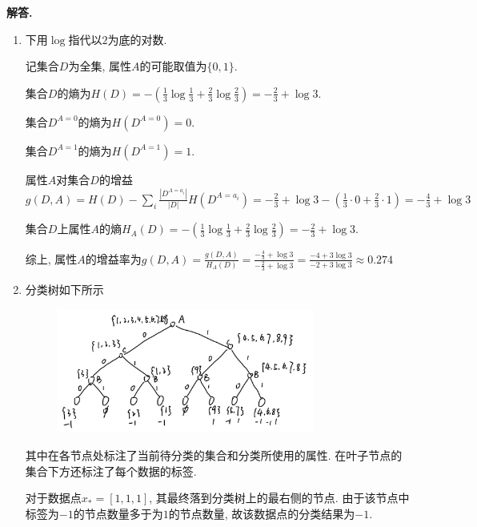 \documentclass[11pt]{article}
\newenvironment{solution}{\par\noindent\textbf{解答. }}{\par}
\begin{document}
	\section{}
	\begin{solution}
		\begin{enumerate}[(1)]
			\item 下用$\log$指代以$2$为底的对数.
			
			记集合$D$为全集, 属性$A$的可能取值为$\{0,1\}$. 
			
			集合$D$的熵为$H(D)=-\left(\frac{1}{3}\log\frac{1}{3}+\frac{2}{3}\log\frac{2}{3}\right)=-\frac{2}{3}+\log 3$.

			集合$D^{A=0}$的熵为$H(D^{A=0})=0$.

			集合$D^{A=1}$的熵为$H(D^{A=1})=1$.

			属性$A$对集合$D$的增益$g(D,A)=H(D)-\sum_i \frac{|D^{A=a_i}|}{|D|}H(D^{A=a_i})=-\frac{2}{3}+\log 3-\left(\frac{1}{3}\cdot 0+\frac{2}{3}\cdot 1\right)=-\frac{4}{3}+\log 3$

			集合$D$上属性$A$的熵$H_A(D)=-\left(\frac{1}{3}\log\frac{1}{3}+\frac{2}{3}\log\frac{2}{3}\right)=-\frac{2}{3}+\log 3$.

			综上, 属性$A$的增益率为$g(D,A)=\frac{g(D,A)}{H_A(D)}=\frac{-\frac{4}{3}+\log 3}{-\frac{2}{3}+\log 3}=\frac{-4+3\log 3}{-2+3\log 3}\approx 0.274$

			\item 分类树如下所示
			\newpage
			
			\begin{figure}[htbp]
				\centering
				\includegraphics[width=0.8\textwidth]{p2.jpg}
				\label{fig:hw4-3}
			\end{figure}

			其中在各节点处标注了当前待分类的集合和分类所使用的属性. 在叶子节点的集合下方还标注了每个数据的标签.

			对于数据点$x_*=[1,1,1]$, 其最终落到分类树上的最右侧的节点. 由于该节点中标签为$-1$的节点数量多于为$1$的节点数量, 故该数据点的分类结果为$-1$.
		\end{enumerate}
	\end{solution}
\end{document}
